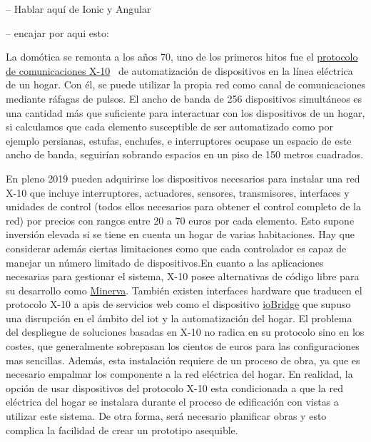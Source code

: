 \vspace{1.5cm}

-- Hablar aquí de Ionic y Angular

-- encajar por aqui esto:

La domótica se remonta a los años 70, uno de los primeros hitos fue el \href{https://es.wikipedia.org/wiki/X10}{protocolo de comunicaciones X-10}~\cite{x10protocolwikipedia} de automatización de dispositivos en la línea eléctrica de un hogar. Con él, se puede utilizar la propia red como canal de comunicaciones mediante ráfagas de pulsos. El ancho de banda de 256 dispositivos simultáneos es una cantidad más que suficiente para interactuar con los dispositivos de un hogar, si calculamos que cada elemento susceptible de ser automatizado como por ejemplo persianas, estufas, enchufes, e interruptores ocupase un espacio de este ancho de banda, seguirían sobrando espacios en un piso de 150 metros cuadrados.

\vspace{1.5cm}

En pleno 2019 pueden adquirirse los dispositivos necesarios para instalar una red X-10 que incluye interruptores, actuadores, sensores, transmisores, interfaces y unidades de control (todos ellos necesarios para obtener el control completo de la red) por precios con rangos entre 20 a 70 euros por cada elemento. Esto supone inversión elevada si se tiene en cuenta un hogar de varias habitaciones. Hay que considerar además ciertas limitaciones como que cada controlador es capaz de manejar un número limitado de dispositivos.En cuanto a las aplicaciones necesarias para gestionar el sistema, X-10 posee alternativas de código libre para su desarrollo como \href{http://www.minervahome.net/}{Minerva}. También existen interfaces hardware que traducen el protocolo X-10 a \gls{api}s de servicios web como el dispositivo \href{http://www.iobridge.com/}{ioBridge} que supuso una disrupción en el ámbito del \gls{iot} y la automatización del hogar. El problema del despliegue de soluciones basadas en X-10 no radica en su protocolo sino en los costes, que generalmente sobrepasan los cientos de euros para las configuraciones mas sencillas. Además, esta instalación requiere de un proceso de obra, ya que es necesario empalmar los componente a la red eléctrica del hogar. En realidad, la opción de usar dispositivos del protocolo X-10 esta condicionada a que la red eléctrica del hogar se instalara durante el proceso de edificación con vistas a utilizar este sistema. De otra forma, será necesario planificar obras y esto complica la facilidad de crear un prototipo asequible.


